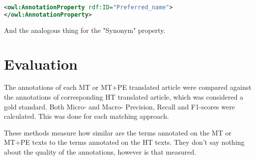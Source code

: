 \begin{lstlisting}[language=xml]
<owl:AnnotationProperty rdf:ID="Preferred_name">
</owl:AnnotationProperty>
\end{lstlisting}


And the analogous thing for the "Synonym" property.

\section{Evaluation}

The annotations of each MT or MT+PE translated article were compared against the annotations of corresponding HT translated article, which was considered a gold standard. Both Micro- and Macro- Precision, Recall and F1-scores were calculated. This was done for each matching approach. 

These methods measure how similar are the terms annotated on the MT or MT+PE texts to the terms annotated on the HT texts. They don't say nothing about the quality of the annotations, however is that measured. 





 